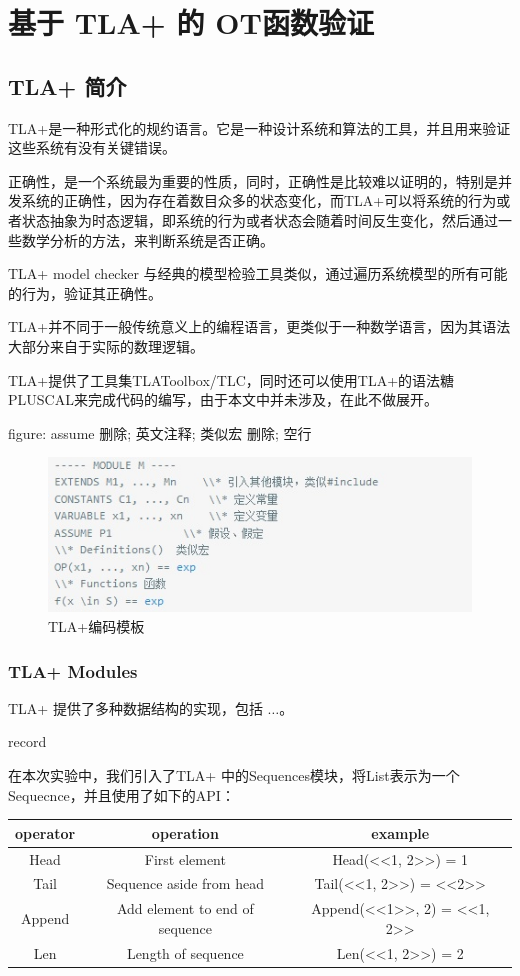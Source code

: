 \chapter{基于 TLA+ 的 OT函数验证} 
\section{TLA+ 简介}
\par TLA+是一种形式化的规约语言。它是一种设计系统和算法的工具，并且用来验证这些系统有没有关键错误。
\par 正确性，是一个系统最为重要的性质，同时，正确性是比较难以证明的，特别是并发系统的正确性，因为存在着数目众多的状态变化，而TLA+可以将系统的行为或者状态抽象为时态逻辑，即系统的行为或者状态会随着时间反生变化，然后通过一些数学分析的方法，来判断系统是否正确。

TLA+ model checker 与经典的模型检验工具类似，通过遍历系统模型的所有可能的行为，验证其正确性。

\par TLA+并不同于一般传统意义上的编程语言，更类似于一种数学语言，因为其语法大部分来自于实际的数理逻辑。
\par TLA+提供了工具集TLAToolbox/TLC，同时还可以使用TLA+的语法糖PLUSCAL来完成代码的编写，由于本文中并未涉及，在此不做展开。

figure: assume 删除; 英文注释; 类似宏 删除; 空行

\begin{figure}
\centering
\includegraphics{figures/module.jpg}
\caption{TLA+编码模板}
\label{fig:graph}
\end{figure}

\subsection{TLA+ Modules}
TLA+ 提供了多种数据结构的实现，包括 $\dots$。

record

在本次实验中，我们引入了TLA+ 中的Sequences模块，将List表示为一个Sequecnce，并且使用了如下的API：\\
\begin{tabular}{ccc}
\hline
operator& operation& example \\
\hline  
 Head& First element &Head(<<1, 2>>) = 1\\
 Tail& Sequence aside from head &Tail(<<1, 2>>) = <<2>>\\
 Append& Add element to end of sequence &Append(<<1>>, 2) = <<1, 2>>\\ 
 Len& Length of sequence &Len(<<1, 2>>) = 2\\
\hline %
\end{tabular}

